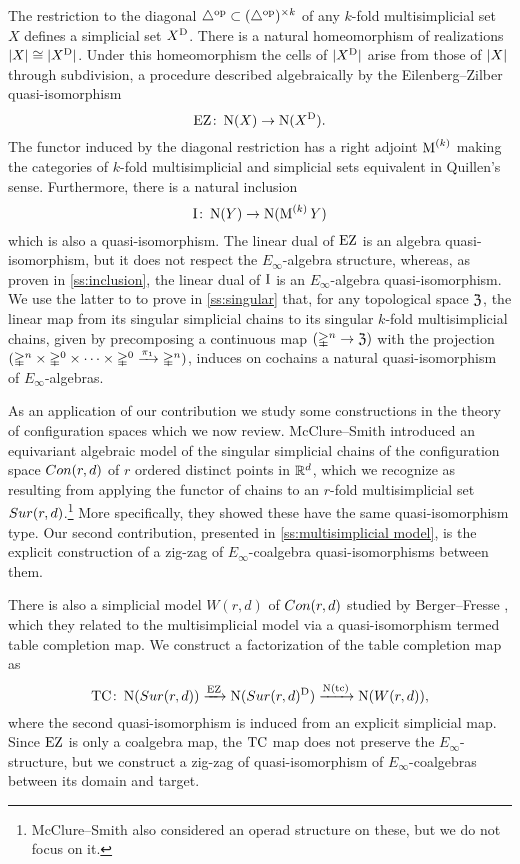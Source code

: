 The restriction to the diagonal $\triangle^{\mathrm{op}} \subset (\triangle^{\mathrm{op}})^{\times k}$ of any $k$-fold multisimplicial set $X$ defines a simplicial set $X^{\mathrm{D}}$.
There is a natural homeomorphism of realizations $\lvert X\rvert \cong \lvert X^{\mathrm{D}}\rvert$.
Under this homeomorphism the cells of $\lvert X^{\mathrm{D}}\rvert$ arise from those of $\lvert X\rvert$ through subdivision, a procedure described algebraically by the Eilenberg--Zilber quasi-isomorphism
\[
\operatorname{EZ} \colon \operatorname{N}(X) \to \operatorname{N}(X^{\mathrm{D}}).
\]
The functor induced by the diagonal restriction has a right adjoint $\operatorname{M}^{(k)}$ making the categories of $k$-fold multisimplicial and simplicial sets equivalent in Quillen's sense.
Furthermore, there is a natural inclusion
\[
\operatorname{I} \colon \operatorname{N}(Y) \to \operatorname{N}(\operatorname{M}^{(k)} Y)
\]
which is also a quasi-isomorphism.
The linear dual of $\operatorname{EZ}$ is an algebra quasi-isomorphism, but it does not respect the $E_\infty$-algebra structure, whereas, as proven in \cref{ss:inclusion}, the linear dual of $\operatorname{I}$ is an $E_\infty$-algebra quasi-isomorphism.
We use the latter to to prove in \cref{ss:singular} that, for any topological space $\mathfrak{Z}$, the linear map from its singular simplicial chains to its singular $k$-fold multisimplicial chains, given by precomposing a continuous map $(\mathbb{\Delta}^n \to \mathfrak{Z})$ with the projection $(\mathbb{\Delta}^n \times \mathbb{\Delta}^{0}\times\dots\times\mathbb{\Delta}^{0} \xrightarrow{\pi_1} \mathbb{\Delta}^n)$, induces on cochains a natural quasi-isomorphism of $E_\infty$-algebras.

As an application of our contribution we study some constructions in the theory of configuration spaces which we now review.
McClure--Smith \cite{mcclure2003multivariable} introduced an equivariant algebraic model of the singular simplicial chains of the configuration space $Con(r,d)$ of $r$ ordered distinct points in $\mathbb{R}^d$, which we recognize as resulting from applying the functor of chains to an $r$-fold multisimplicial set $Sur(r,d)$.\footnote{McClure--Smith also considered an operad structure on these, but we do not focus on it.}
More specifically, they showed these have the same quasi-isomorphism type.
Our second contribution, presented in \cref{ss:multisimplicial model}, is the explicit construction of a zig-zag of $E_\infty$-coalgebra quasi-isomorphisms between them.

There is also a simplicial model $W(r,d)$ of $Con(r,d)$ studied by Berger--Fresse \cite{berger2004combinatorial}, which they related to the multisimplicial model via a quasi-isomorphism termed table completion map.
We construct a factorization of the table completion map as
\[
\mathrm{TC} \colon
\operatorname{N}(Sur(r,d))
\xrightarrow{\operatorname{EZ}}
\operatorname{N}(Sur(r,d)^{\mathrm{D}})
\xrightarrow{\operatorname{N}(\mathrm{tc})}
\operatorname{N}(W(r,d)),
\]
where the second quasi-isomorphism is induced from an explicit simplicial map.
Since $\operatorname{EZ}$ is only a coalgebra map, the $\mathrm{TC}$ map does not preserve the $E_\infty$-structure, but we construct a zig-zag of quasi-isomorphism of $E_\infty$-coalgebras between its domain and target.